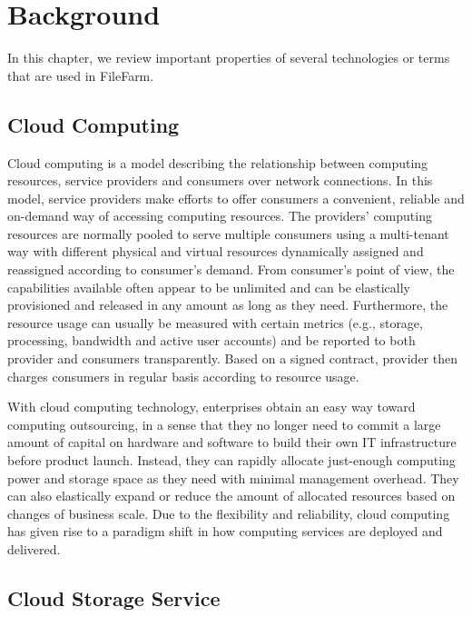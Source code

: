 \chapter{Background}
\label{c:background}

In this chapter, we review important properties of several technologies or terms that are used in FileFarm.

\section{Cloud Computing}
\label{s:cloudcomputing}

Cloud computing is a model describing the relationship between computing resources, service providers and consumers over network connections. In this model, service providers make efforts to offer consumers a convenient, reliable and on-demand way of accessing computing resources. The providers' computing resources are normally pooled to serve multiple consumers using a multi-tenant way with different physical and virtual resources dynamically assigned and reassigned according to consumer's demand. From consumer's point of view, the capabilities available often appear to be unlimited and can be elastically provisioned and released in any amount as long as they need. Furthermore, the resource usage can usually be measured with certain metrics (e.g., storage, processing, bandwidth and active user accounts) and be reported to both provider and consumers transparently. Based on a signed contract, provider then charges consumers in regular basis according to resource usage.\cite{mell2011nist}

With cloud computing technology, enterprises obtain an easy way toward computing outsourcing, in a sense that they no longer need to commit a large amount of capital on hardware and software to build their own IT infrastructure before product launch. Instead, they can rapidly allocate just-enough computing power and storage space as they need with minimal management overhead. They can also elastically expand or reduce the amount of allocated resources based on changes of business scale. Due to the flexibility and reliability, cloud computing has given rise to a paradigm shift in how computing services are deployed and delivered.\cite{6123700}

\section{Cloud Storage Service}
\label{s:cloudstorageservice}

